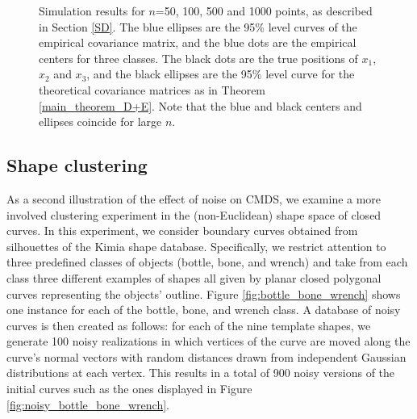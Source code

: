 \begin{figure}[htbp]
    \caption{Simulation results for $n$=50, 100, 500 and 1000 points, as described in Section \ref{SD}. The blue ellipses are the 95\% level curves of the empirical covariance matrix, and the blue dots are the empirical centers for three classes. The black dots are the true positions of $x_1$, $x_2$ and $x_3$, and the black ellipses are the 95\% level curve for the theoretical covariance matrices as in Theorem \ref{main_theorem_D+E}. Note that the blue and black centers and ellipses coincide for large $n$.}%
    \label{fig:Simulation result}%
\end{figure}

\subsection{Shape clustering}
As a second illustration of the effect of noise on CMDS, we examine a more involved clustering experiment in the (non-Euclidean) shape space of closed curves. In this experiment, we consider boundary curves obtained from silhouettes of the Kimia shape database. Specifically, we restrict attention to three predefined classes of objects (bottle, bone, and wrench) and take from each class three different examples of shapes all given by planar closed polygonal curves representing the objects' outline. Figure \ref{fig:bottle_bone_wrench} shows one instance for each of the bottle, bone, and wrench class. A database of noisy curves is then created as follows: for each of the nine template shapes, we generate 100 noisy realizations in which vertices of the curve are moved along the curve's normal vectors with random distances drawn from independent Gaussian distributions at each vertex. This results in a total of 900 noisy versions of the initial curves such as the ones displayed in Figure \ref{fig:noisy_bottle_bone_wrench}.

